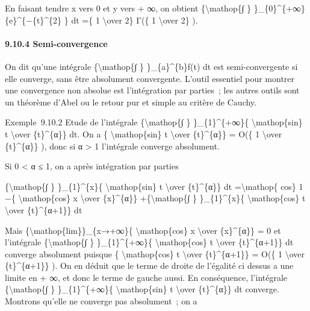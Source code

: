 \documentclass[]{article}
\begin{document}
En faisant tendre x vers 0 et y vers + ∞, on obtient
\{\textbackslash{}mathop\{∫ \}
\}\_\{0\}\^{}\{+∞\}\{e\}\^{}\{−\{t\}\^{}\{2\} \} dt =\{ 1
\textbackslash{}over 2\} Γ(\{ 1 \textbackslash{}over 2\} ).

\paragraph{9.10.4 Semi-convergence}

On dit qu'une intégrale \{\textbackslash{}mathop\{∫ \}
\}\_\{a\}\^{}\{b\}f(t) dt est semi-convergente si elle converge, sans
être absolument convergente. L'outil essentiel pour montrer une
convergence non absolue est l'intégration par parties~; les autres
outils sont un théorème d'Abel ou le retour pur et simple au critère de
Cauchy.

Exemple~9.10.2 Etude de l'intégrale \{\textbackslash{}mathop\{∫ \}
\}\_\{1\}\^{}\{+∞\}\{ \textbackslash{}mathop\{sin\} t
\textbackslash{}over \{t\}\^{}\{α\}\} dt. On a \{
\textbackslash{}mathop\{sin\} t \textbackslash{}over \{t\}\^{}\{α\}\} =
O(\{ 1 \textbackslash{}over \{t\}\^{}\{α\}\} ), donc si α \textgreater{}
1 l'intégrale converge absolument.

Si 0 \textless{} α ≤ 1, on a après intégration par parties

\{\textbackslash{}mathop\{∫ \} \}\_\{1\}\^{}\{x\}\{
\textbackslash{}mathop\{sin\} t \textbackslash{}over \{t\}\^{}\{α\}\} dt
=\textbackslash{}mathop\{ cos\} 1 −\{ \textbackslash{}mathop\{cos\} x
\textbackslash{}over \{x\}\^{}\{α\}\} +\{\textbackslash{}mathop\{∫ \}
\}\_\{1\}\^{}\{x\}\{ \textbackslash{}mathop\{cos\} t
\textbackslash{}over \{t\}\^{}\{α+1\}\} dt

Mais \{\textbackslash{}mathop\{lim\}\}\_\{x→+∞\}\{
\textbackslash{}mathop\{cos\} x \textbackslash{}over \{x\}\^{}\{α\}\} =
0 et l'intégrale \{\textbackslash{}mathop\{∫ \} \}\_\{1\}\^{}\{+∞\}\{
\textbackslash{}mathop\{cos\} t \textbackslash{}over \{t\}\^{}\{α+1\}\}
dt converge absolument puisque \{ \textbackslash{}mathop\{cos\} t
\textbackslash{}over \{t\}\^{}\{α+1\}\} = O(\{ 1 \textbackslash{}over
\{t\}\^{}\{α+1\}\} ). On en déduit que le terme de droite de l'égalité
ci dessus a une limite en + ∞, et donc le terme de gauche aussi. En
conséquence, l'intégrale \{\textbackslash{}mathop\{∫ \}
\}\_\{1\}\^{}\{+∞\}\{ \textbackslash{}mathop\{sin\} t
\textbackslash{}over \{t\}\^{}\{α\}\} dt converge. Montrons qu'elle ne
converge pas absolument~; on a
\end{document}

